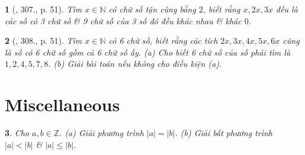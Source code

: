 \documentclass{article}
\newtheorem{baitoan}{}
\begin{document}
\begin{baitoan}[\cite{Binh_Toan_6_tap_1}, 307., p. 51]
	Tìm $x\in\mathbb{N}$ có chữ số tận cùng bằng $2$, biết rằng $x,2x,3x$ đều là các số có 3 chữ số \& 9 chữ số của 3 số đó đều khác nhau \& khác $0$.
\end{baitoan}

\begin{baitoan}[\cite{Binh_Toan_6_tap_1}, 308., p. 51]
	Tìm $x\in\mathbb{N}$ có 6 chữ số, biết rằng các tích $2x,3x,4x,5x,6x$ cũng là số có 6 chữ số gồm cả 6 chữ số ấy. (a) Cho biết 6 chữ số của số phải tìm là $1,2,4,5,7,8$. (b) Giải bài toán nếu không cho điều kiện (a).
\end{baitoan}


\section{Miscellaneous}

\begin{baitoan}
	Cho $a,b\in\mathbb{Z}$. (a) Giải phương trình $|a| = |b|$. (b) Giải bất phương trình $|a| < |b|$ \& $|a|\le|b|$.
\end{baitoan}


\printbibliography[heading=bibintoc]
\end{document}
